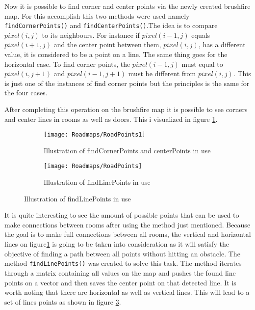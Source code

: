 \documentclass[../Head/Main.tex]{subfiles}
\begin{document}
Now it is possible to find corner and center points via the newly created brushfire map. For this accomplish this two methods were used namely \texttt{findCornerPoints()} and \texttt{findCenterPoints()}.The idea is to compare $pixel(i,j)$ to its neighbours. For instance if $pixel(i-1,j)$ equals $pixel(i+1,j)$ and the center point between them, $pixel(i,j)$, has a different value, it is considered to be a point on a line. The same thing goes for the horizontal case. To find corner points, the $pixel(i-1,j)$ must equal to $pixel(i,j+1)$ and $pixel(i-1,j+1)$ must be different from $pixel(i,j)$. This is just one of the instances of find corner points but the principles is the same for the four cases.           

After completing this operation on the brushfire map it is possible to see corners and center lines in rooms as well as doors. This i visualized in figure \ref{fig:CornersAndCentersOfRoom}.
  
  \begin{figure}[H]
   \begin{subfigure}[b]{0.49\textwidth}
    \centering
    \texttt{[image: Roadmaps/RoadPoints1]}
    \caption{Illustration of findCornerPoints and centerPoints in use}
    \label{fig:CornersAndCentersOfRoom}
  \end{subfigure}
  \hfill
   \begin{subfigure}[b]{0.49\textwidth}
    \centering
    \texttt{[image: Roadmaps/RoadPoints]}
    \caption{Illustration of findLinePoints in use}
    \label{fig:LinePoints}
  \end{subfigure}
  \end{figure}

It is quite interesting to see the amount of possible points that can be used to make connections between rooms after using the method just mentioned. Because the goal is to make full connections between all rooms, the vertical and horizontal lines on figure\ref{fig:CornersAndCentersOfRoom} is going to be taken into consideration as it will satisfy the objective of finding a path between all points without hitting an obstacle. The method \texttt{findLinePoints()} was created to solve this task. The method iterates through a matrix containing all values on the map and pushes the found line points on a vector and then saves the center point on that detected line. It is worth noting that there are horizontal as well as vertical lines. This will lead to a set of lines points as shown in figure \ref{fig:LinePoints}. 
\end{document}
